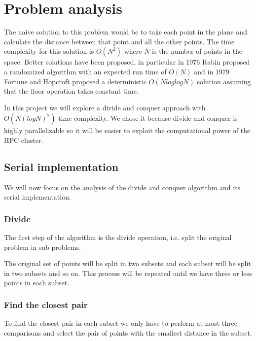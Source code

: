 \section{Problem analysis}
\label{sec:problem_analysis}


The naive solution to this problem would be to take each point
in the plane and calculate the distance between that point and all
the other points. The time complexity for this solution is $O(N^2)$
where $N$ is the number of points in the space.
Better solutions have been proposed, in particular in 1976
Rabin proposed a randomized algorithm with an expected run time
of $O(N)$ and in 1979 Fortune and Hopcroft proposed a
deterministic $O(N log log N)$ solution \cite{Fortune_Hopcroft}
assuming that the floor operation takes constant time.

In this project we will explore a divide and conquer approach
with $O(N(logN)^2)$ time complexity. We chose it because
divide and conquer is highly parallelizable so it will be easier
to exploit the computational power of the HPC cluster.

\subsection{Serial implementation}

We will now focus on the analysis of the divide and conquer algorithm
and its serial implementation.

\subsubsection{Divide}
The first step of the algorithm is the divide operation, i.e.
split the original problem in sub problems.

The original set of points will be split in two subsets and each
subset will be split in two subsets and so on. This process will be repeated
until we have three or less points in each subset.

\subsubsection{Find the closest pair}
To find the closest pair in each subset we only have to perform
at most three comparisons and select the pair of points with the smallest
distance in the subset.

